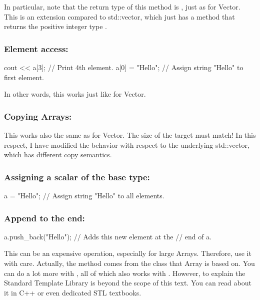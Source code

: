 In particular, note that the return type of this method is
, just as for Vector. This is an extension compared to
std::vector, which just has a method  that returns the
positive integer type .

\subsubsection{Element access:}
\begin{code}
cout << a[3];   // Print 4th element.
a[0] = "Hello"; // Assign string "Hello" to first element.
\end{code}

In other words, this works just like for Vector.

\subsubsection{Copying Arrays:}

This works also the same as for Vector. The size of the target must
match! In this respect, I have modified the behavior with respect to
the underlying std::vector, which has different copy semantics.

\subsubsection{Assigning a scalar of the base type:}
\begin{code}
a = "Hello";    // Assign string "Hello" to all elements.
\end{code}

\subsubsection{Append to the end:}
\begin{code}
a.push_back("Hello"); // Adds this new element at the
                      // end of a.
\end{code}

This can be an expensive operation, especially for large Arrays.
Therefore, use it with care. Actually, the  method
comes from the  class that Array is based on. You
can do a lot more with , all of which also works
with . However, to explain the Standard Template Library
is beyond the scope of this text. You can read about it in C++ or even
dedicated STL textbooks.

